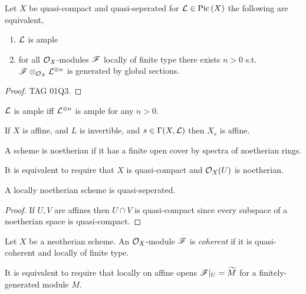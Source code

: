 \documentclass[12pt]{article}
\begin{document}
\begin{proposition}
Let $X$ be quasi-compact and quasi-seperated for $\mathcal{L} \in \mathrm{Pic} \left( X \right)$ the following are equivalent,
\begin{enumerate}
\item $\mathcal{L}$ is ample
\item for all $\mathcal{O}_{X}$-modules $\mathscr{F}$ locally of finite type there exists $n > 0$ s.t. $\mathscr{F} \otimes_{\mathcal{O}_{X}} \mathcal{L}^{\otimes n}$ is generated by global sections.
\end{enumerate}
\end{proposition}

\begin{proof}
TAG 01Q3.
\end{proof}

\begin{lemma}
$\mathcal{L}$ is ample iff $\mathcal{L}^{\otimes n}$ is ample for any $n > 0$. 
\end{lemma}

\begin{lemma}
If $X$ is affine, and $L$ is invertible, and $s \in \Gamma(X, \mathcal{L})$ then $X_s$ is affine. 
\end{lemma}

\begin{definition}
A scheme is noetherian if it has a finite open cover by spectra of noetherian rings. 
\end{definition}

\begin{remark}
It is equivalent to require that $X$ is quasi-compact and $\mathcal{O}_{X}(U)$ is noetherian. 
\end{remark}

\begin{lemma}
A locally noetherian scheme is quasi-seperated.
\end{lemma}

\begin{proof}
If $U, V$ are affines then $U \cap V$ is quasi-compact since every subspace of a noetherian space is quasi-compact.
\end{proof}

\begin{definition}
Let $X$ be a neotherian scheme. An $\mathcal{O}_{X}$-module $\mathscr{F}$ is \textit{coherent} if it is quasi-coherent and locally of finite type. 
\end{definition}

\begin{remark}
It is equivalent to require that locally on affine opens $\mathscr{F} |_U = \widetilde{M}$ for a finitely-generated module $M$. 
\end{remark}
\end{document}
